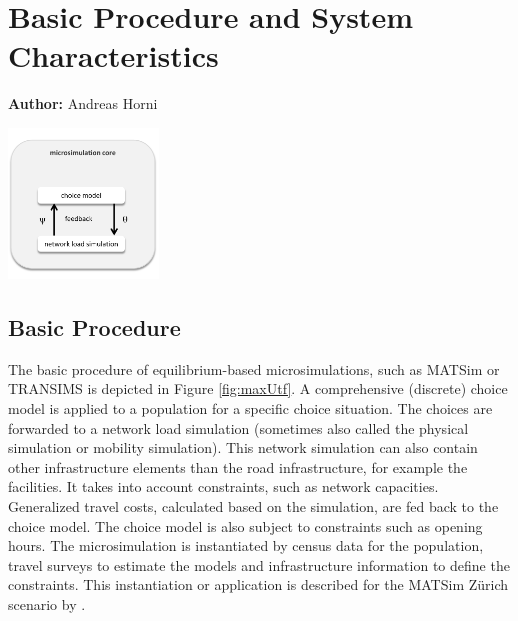\chapter{Basic Procedure and System Characteristics}
\label{ch:basicprocedure}
\hfill \textbf{Author:} Andreas Horni 

\begin{center} \includegraphics[width=0.3\textwidth, angle=0]{understanding/figures/fixedpoint.pdf} \end{center}



\section{Basic Procedure}
The basic procedure of equilibrium-based microsimulations, such as MATSim or TRANSIMS is depicted in Figure \ref{fig:maxUtf}. A comprehensive (discrete) choice model is applied to a population for a specific choice situation. The choices are forwarded to a network load simulation (sometimes also called the physical simulation or mobility simulation). This network simulation can also contain other infrastructure elements than the road infrastructure, for example the facilities. It takes into account constraints, such as network capacities. Generalized travel costs, calculated based on the simulation, are fed back to the choice model. The choice model is also subject to constraints such as opening hours. The microsimulation is instantiated by census data for the population, travel surveys to estimate the models and infrastructure information to define the constraints. This instantiation or application is described for the MATSim Zürich scenario by  \citet[][]{HorniEtAl_TechRep_IVT_2011_a}. %

